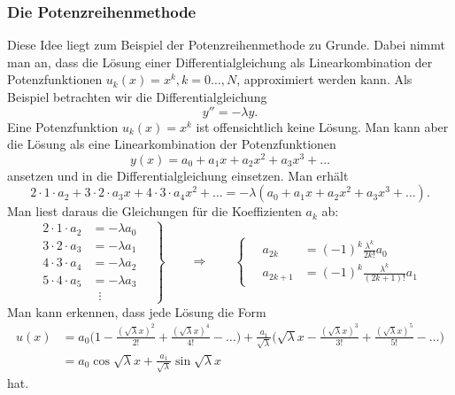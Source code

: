 \subsubsection{Die Potenzreihenmethode}
Diese Idee liegt zum Beispiel der Potenzreihenmethode zu Grunde.
Dabei nimmt man an, dass die Lösung einer Differentialgleichung als
Linearkombination der Potenzfunktionen $u_k(x)=x^k, k=0\dots,N$,
approximiert werden kann.
Als Beispiel betrachten wir die Differentialgleichung
\[
y''=-\lambda y.
\]
Eine Potenzfunktion $u_k(x)=x^k$ ist offensichtlich keine Lösung.
Man kann aber die Lösung als eine Linearkombination
der Potenzfunktionen
\[
y(x)
=
a_0+a_1x+a_2x^2+a_3x^3+\dots
\]
ansetzen und in die Differentialgleichung einsetzen.
Man erhält
\[
2\cdot 1 \cdot a_2
+
3\cdot 2 \cdot a_3x
+
4\cdot 3 \cdot a_4x^2
+
\dots
=
-\lambda(
a_0+a_1x+a_2x^2+a_3x^3+\dots).
\]
Man liest daraus die Gleichungen für die Koeffizienten $a_k$ ab:
\begin{equation*}
\left.
\begin{aligned}
2\cdot 1\cdot a_2&=-\lambda a_0\\
3\cdot 2\cdot a_3&=-\lambda a_1\\
4\cdot 3\cdot a_4&=-\lambda a_2\\
5\cdot 4\cdot a_5&=-\lambda a_3\\
&\;\;\vdots
\end{aligned}
\quad
\right\}
\qquad\Rightarrow\qquad
\left\{
\quad
\begin{aligned}
a_{2k}  &=(-1)^k\frac{\lambda^k}{ 2k!   }a_0\\
a_{2k+1}&=(-1)^k\frac{\lambda^k}{(2k+1)!}a_1
\end{aligned}
\right.
\end{equation*}
Man kann erkennen, dass jede Lösung die Form
\begin{align*}
u(x)
&=
a_0
\biggl(
1-\frac{(\sqrt{\lambda}x)^2}{2!} + \frac{(\sqrt{\lambda}x)^4}{4!}-\dots
\biggr)
+
\frac{a_1}{\sqrt{\lambda}}
\biggl(
\sqrt{\lambda}x
-
\frac{(\sqrt{\lambda}x)^3}{3!} + \frac{(\sqrt{\lambda}x)^5}{5!}-\dots
\biggr)
\\
&= a_0 \cos \sqrt{\lambda}x
+ \frac{a_1}{\sqrt{\lambda}} \sin\sqrt{\lambda}x
\end{align*}
hat.

